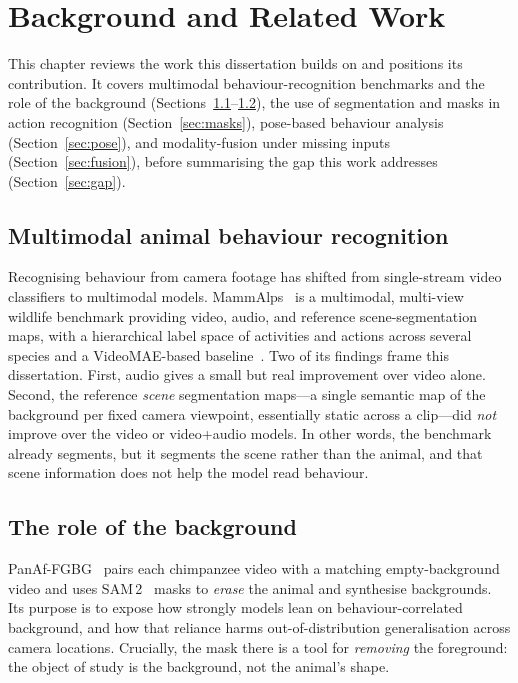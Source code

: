 \documentclass[12pt,a4paper]{report}
\begin{document}
\chapter{Background and Related Work}
\label{ch:related}

This chapter reviews the work this dissertation builds on and positions its contribution.
It covers multimodal behaviour-recognition benchmarks and the role of the background
(Sections~\ref{sec:multimodal}--\ref{sec:background}), the use of segmentation and masks in
action recognition (Section~\ref{sec:masks}), pose-based behaviour analysis
(Section~\ref{sec:pose}), and modality-fusion under missing inputs (Section~\ref{sec:fusion}),
before summarising the gap this work addresses (Section~\ref{sec:gap}).

\section{Multimodal animal behaviour recognition}
\label{sec:multimodal}
Recognising behaviour from camera footage has shifted from single-stream video classifiers
to multimodal models. MammAlps~\cite{mammalps} is a multimodal, multi-view wildlife
benchmark providing video, audio, and reference scene-segmentation maps, with a hierarchical
label space of activities and actions across several species and a VideoMAE-based
baseline~\cite{videomae}. Two of its findings frame this dissertation. First, audio gives a
small but real improvement over video alone. Second, the reference \emph{scene}
segmentation maps---a single semantic map of the background per fixed camera viewpoint,
essentially static across a clip---did \emph{not} improve over the video or video+audio
models. In other words, the benchmark already segments, but it segments the scene rather
than the animal, and that scene information does not help the model read behaviour.

\section{The role of the background}
\label{sec:background}
PanAf-FGBG~\cite{panaf} pairs each chimpanzee video with a matching empty-background video
and uses SAM\,2~\cite{sam2} masks to \emph{erase} the animal and synthesise backgrounds. Its
purpose is to expose how strongly models lean on behaviour-correlated background, and how
that reliance harms out-of-distribution generalisation across camera locations. Crucially,
the mask there is a tool for \emph{removing} the foreground: the object of study is the
background, not the animal's shape.
\end{document}
